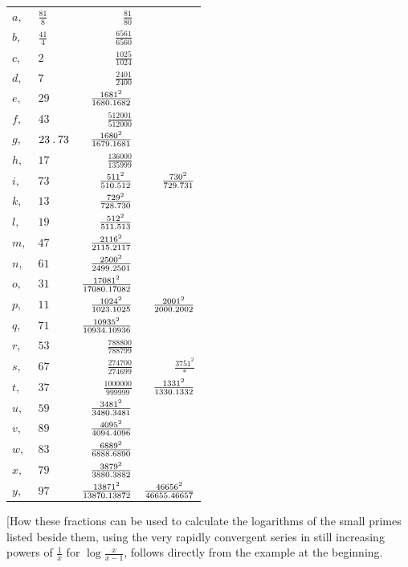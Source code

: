 \begin{longtable}{@{}llrr@{}}
$a,$ & $\frac{81}{8}$ & $\frac{81}{80}$ & \\
$b,$ & $\frac{41}{4}$ & $\frac{6561}{6560}$ & \\
$c,$ & $2$ & $\frac{1025}{1024}$ & \\
$d,$ & $7$ & $\frac{2401}{2400}$ & \\
$e,$ & $29$ & $\frac{1681^2}{1680\mathbin{.} 1682}$ & \\
$f,$ & $43$ & $\frac{512001}{512000}$ & \\
$g,$ & $23\mathbin{.} 73$ & $\frac{1680^2}{1679\mathbin{.} 1681}$ & \\
$h,$ & $17$ & $\frac{136000}{135999}$ & \\
$i,$ & $73$ & $\frac{511^2}{510\mathbin{.} 512}$ &  $\frac{730^2}{729\mathbin{.} 731}$\\
$k,$ & $13$ & $\frac{729^2}{728\mathbin{.} 730}$ & \\
$l,$ & $19$ & $\frac{512^2}{511\mathbin{.} 513}$ & \\
$m,$ & $47$ & $\frac{2116^2}{2115\mathbin{.} 2117}$ & \\
$n,$ & $61$ & $\frac{2500^2}{2499\mathbin{.} 2501}$ & \\
$o,$ & $31$ & $\frac{17081^2}{17080\mathbin{.} 17082}$ & \\
$p,$ & $11$ & $\frac{1024^2}{1023\mathbin{.} 1025}$ &  $\frac{2001^2}{2000\mathbin{.} 2002}$\\
$q,$ & $71$ & $\frac{10935^2}{10934\mathbin{.} 10936}$ & \\
$r,$ & $53$ & $\frac{788800}{788799}$ & \\
$s,$ & $67$ & $\frac{274700}{274699}$ &  $\frac{3751^2}{*}$\\
$t,$ & $37$ & $\frac{1000000}{999999}$ &  $\frac{1331^2}{1330\mathbin{.} 1332}$\\
$u,$ & $59$ & $\frac{3481^2}{3480\mathbin{.} 3481}$ & \\
$v,$ & $89$ & $\frac{4095^2}{4094\mathbin{.} 4096}$ & \\
$w,$ & $83$ & $\frac{6889^2}{6888\mathbin{.} 6890}$ & \\
$x,$ & $79$ & $\frac{3879^2}{3880\mathbin{.} 3882}$ & \\
$y,$ & $97$ & $\frac{13871^2}{13870\mathbin{.} 13872}$ &  $\frac{46656^2}{46655\mathbin{.} 46657}$\\
\end{longtable}\endgroup
[How these fractions can be used to calculate the logarithms of the small primes listed beside them, using the very rapidly convergent series in still increasing powers of $\frac1x$ for $\log\frac{x}{x-1}$, follows directly from the example at the beginning.\par
